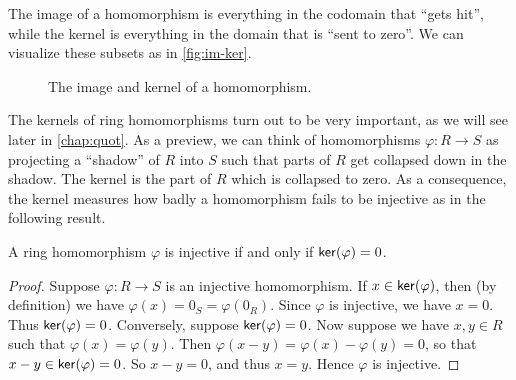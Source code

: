 The image of a homomorphism is everything in the codomain that ``gets hit'', while the kernel is everything in the domain that is ``sent to zero''.
We can visualize these subsets as in \autoref{fig:im-ker}.
\begin{figure}[h!]
\begin{center}
\caption{\label{fig:im-ker} The image and kernel of a homomorphism.}
\end{center}
\end{figure}
The kernels of ring homomorphisms turn out to be very important, as we will see later in \autoref{chap:quot}.
As a preview, we can think of homomorphisms \(\varphi : R \rightarrow S\) as projecting a ``shadow'' of \(R\) into \(S\) such that parts of \(R\) get collapsed down in the shadow.
The kernel is the part of \(R\) which is collapsed to zero.
As a consequence, the kernel measures how badly a homomorphism fails to be injective as in the following result.

\begin{prop} \label{prop:ker-zero}
A ring homomorphism \(\varphi\) is injective if and only if \( \mathsf{ker}(\varphi)  = 0\).
\end{prop}

\begin{proof}
Suppose \(\varphi : R \rightarrow S\) is an injective homomorphism.
If \(x \in  \mathsf{ker}(\varphi) \), then (by definition) we have \(\varphi(x) = 0_S = \varphi(0_R)\).
Since \(\varphi\) is injective, we have \(x = 0\).
Thus \( \mathsf{ker}(\varphi)  = 0\).
Conversely, suppose \( \mathsf{ker}(\varphi)  = 0\).
Now suppose we have \(x,y \in R\) such that \(\varphi(x) = \varphi(y)\).
Then \(\varphi(x - y) = \varphi(x) - \varphi(y) = 0\), so that \(x-y \in  \mathsf{ker}(\varphi)  = 0\).
So \(x-y = 0\), and thus \(x = y\).
Hence \(\varphi\) is injective.
\end{proof}

